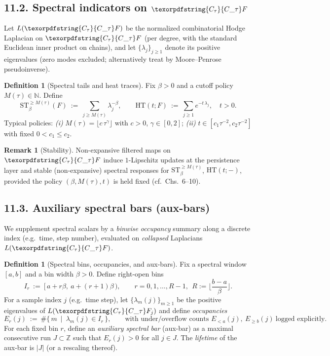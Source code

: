 \documentclass[11pt]{article}
\DeclareRobustCommand{\hyp}{\nobreakdash-}
\numberwithin{equation}{section}
\theoremstyle{definition}
\newtheorem{definition}[theorem]{Definition}
\newtheorem{remark}[theorem]{Remark}
\DeclareRobustCommand{\Ctau}{\texorpdfstring{\ensuremath{C_{\tau}}}{C\_\tau}}
\begin{document}
\subsection*{11.2. Spectral indicators on \texorpdfstring{$\Ctau F$}{C\_tau F}}
Let $L(\Ctau F)$ be the normalized combinatorial Hodge Laplacian on $\Ctau F$ (per degree, with the standard Euclidean inner product on chains), and let $\{\lambda_{j}\}_{j\ge 1}$ denote its positive eigenvalues (zero modes excluded; alternatively treat by Moore–Penrose pseudoinverse).
\begin{definition}[Spectral tails and heat traces]\label{def:11-spectral}
Fix $\beta>0$ and a cutoff policy $M(\tau)\in\mathbb{N}$. Define
\[
  \mathrm{ST}_{\beta}^{\ge M(\tau)}(F)\ :=\ \sum_{j\ge M(\tau)} \lambda_{j}^{-\beta},\qquad \mathrm{HT}(t;F)\ :=\ \sum_{j\ge 1} e^{-t\,\lambda_{j}},\quad t>0.
\]
Typical policies: \emph{(i)} $M(\tau)=\lfloor c\,\tau^{\gamma}\rfloor$ with $c>0$, $\gamma\in[0,2]$; \emph{(ii)} $t\in[c_1\tau^{-2},c_2\tau^{-2}]$ with fixed $0<c_1\le c_2$.
\end{definition}

\begin{remark}[Stability]
Non\hyp expansive filtered maps on $\Ctau F$ induce $1$-Lipschitz updates at the persistence layer and stable (non\hyp expansive) spectral responses for $\mathrm{ST}_{\beta}^{\ge M(\tau)}$, $\mathrm{HT}(t;-)$, provided the policy $(\beta,M(\tau),t)$ is held fixed (cf.\ Chs.~6–10).
\end{remark}

\subsection*{11.3. Auxiliary spectral bars (aux-bars)}
We supplement spectral scalars by a \emph{binwise occupancy} summary along a discrete index (e.g.\ time, step number), evaluated on \emph{collapsed} Laplacians $L(\Ctau F)$.

\begin{definition}[Spectral bins, occupancies, and aux-bars]\label{def:11-aux-bars}
Fix a spectral window $[a,b]$ and a bin width $\beta>0$. Define right-open bins
\[
I_r\ :=\ [\,a+r\beta,\ a+(r+1)\beta\,),\qquad r=0,1,\dots,R-1,\ \ R:=\Big\lfloor\frac{b-a}{\beta}\Big\rfloor.
\]
For a sample index $j$ (e.g.\ time step), let $\{\lambda_m(j)\}_{m\ge 1}$ be the positive eigenvalues of $L(\Ctau F_j)$ and define \emph{occupancies}
\[
E_r(j)\ :=\ \#\{\,m\ \mid\ \lambda_m(j)\in I_r\,\},\qquad \text{with under/overflow counts }E_{<a}(j),\ E_{\ge b}(j)\ \text{logged explicitly}.
\]
For each fixed bin $r$, define an \emph{auxiliary spectral bar} (aux-bar) as a maximal consecutive run $J\subset\mathbb{Z}$ such that $E_r(j)>0$ for all $j\in J$. The \emph{lifetime} of the aux-bar is $|J|$ (or a rescaling thereof).
\end{definition}
\end{document}
